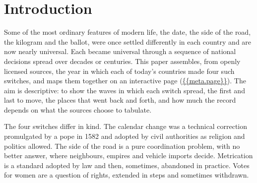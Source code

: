 \documentclass[11pt,a4paper]{article}
\begin{document}
\section{Introduction}
Some of the most ordinary features of modern life, the date, the side of the road, the kilogram and the ballot, were once settled differently in each country and are now nearly universal. Each became universal through a sequence of national decisions spread over decades or centuries. This paper assembles, from openly licensed sources, the year in which each of today's countries made four such switches, and maps them together on an interactive page (\url{{{meta.page}}}). The aim is descriptive: to show the waves in which each switch spread, the first and last to move, the places that went back and forth, and how much the record depends on what the sources choose to tabulate.

The four switches differ in kind. The calendar change was a technical correction promulgated by a pope in 1582 and adopted by civil authorities as religion and politics allowed. The side of the road is a pure coordination problem, with no better answer, where neighbours, empires and vehicle imports decide. Metrication is a standard adopted by law and then, sometimes, abandoned in practice. Votes for women are a question of rights, extended in steps and sometimes withdrawn.
\end{document}
